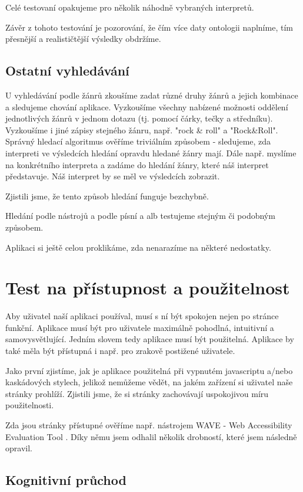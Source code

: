 Celé testovaní opakujeme pro několik náhodně vybraných interpretů.

Závěr z tohoto testování je pozorování, že čím více daty ontologii naplníme, tím přesnější a realističtější výsledky obdržíme.

\subsection{Ostatní vyhledávání}

U vyhledávání podle žánrů zkoušíme zadat různé druhy žánrů a jejich kombinace a sledujeme chování aplikace. Vyzkoušíme všechny nabízené možnosti oddělení jednotlivých žánrů v jednom dotazu (tj. pomocí čárky, tečky a středníku). Vyzkoušíme i jiné zápisy stejného žánru, např. "rock \& roll" a "Rock\&Roll". 
Správný hledací algoritmus ověříme triviálním způsobem - sledujeme, zda interpreti ve výsledcích hledání opravdu hledané žánry mají. 
Dále např. myslíme na konkrétního interpreta a zadáme do hledání žánry, které náš interpret představuje. Náš interpret by se měl ve výsledcích zobrazit.

Zjistili jsme, že tento způsob hledání funguje bezchybně.

Hledání podle nástrojů a podle písní a alb testujeme stejným či podobným způsobem.

Aplikaci si ještě celou proklikáme, zda nenarazíme na některé nedostatky. 


\section{Test na přístupnost a použitelnost}

Aby uživatel naší aplikaci používal, musí s ní být spokojen nejen po stránce funkční. Aplikace musí být pro uživatele maximálně pohodlná, intuitivní a samovysvětlující. Jedním slovem tedy aplikace musí být použitelná.
Aplikace by také měla být přístupná i např. pro zrakově postižené uživatele.

Jako první zjistíme, jak je aplikace použitelná při vypnutém javascriptu a/nebo kaskádových stylech, jelikož nemůžeme vědět, na jakém zařízení si uživatel naše stránky prohlíží.
Zjistili jsme, že si stránky zachovávají uspokojivou míru použitelnosti.

Zda jsou stránky přístupné ověříme např. nástrojem WAVE - Web Accessibility Evaluation Tool \cite{wave}. Díky němu jsem odhalil několik drobností, které jsem následně opravil.

\subsection{Kognitivní průchod}

